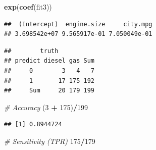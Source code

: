 \documentclass[]{article}
\newenvironment{Shaded}{\begin{snugshade}}{\end{snugshade}}
\newcommand{\KeywordTok}[1]{\textcolor[rgb]{0.13,0.29,0.53}{\textbf{#1}}}
\newcommand{\DataTypeTok}[1]{\textcolor[rgb]{0.13,0.29,0.53}{#1}}
\newcommand{\DecValTok}[1]{\textcolor[rgb]{0.00,0.00,0.81}{#1}}
\newcommand{\FloatTok}[1]{\textcolor[rgb]{0.00,0.00,0.81}{#1}}
\newcommand{\StringTok}[1]{\textcolor[rgb]{0.31,0.60,0.02}{#1}}
\newcommand{\CommentTok}[1]{\textcolor[rgb]{0.56,0.35,0.01}{\textit{#1}}}
\newcommand{\OperatorTok}[1]{\textcolor[rgb]{0.81,0.36,0.00}{\textbf{#1}}}
\newcommand{\NormalTok}[1]{#1}
\begin{document}
\begin{Shaded}
\begin{Highlighting}[]
\KeywordTok{exp}\NormalTok{(}\KeywordTok{coef}\NormalTok{(fit3))}
\end{Highlighting}
\end{Shaded}

\begin{verbatim}
##  (Intercept)  engine.size     city.mpg 
## 3.698542e+07 9.565917e-01 7.050049e-01
\end{verbatim}

\begin{Shaded}
\end{Shaded}

\begin{verbatim}
##        truth
## predict diesel gas Sum
##     0        3   4   7
##     1       17 175 192
##     Sum     20 179 199
\end{verbatim}

\begin{Shaded}
\begin{Highlighting}[]
\CommentTok{# Accuracy}
\NormalTok{(}\DecValTok{3} \OperatorTok{+}\StringTok{ }\DecValTok{175}\NormalTok{)}\OperatorTok{/}\DecValTok{199}
\end{Highlighting}
\end{Shaded}

\begin{verbatim}
## [1] 0.8944724
\end{verbatim}

\begin{Shaded}
\begin{Highlighting}[]
\CommentTok{# Sensitivity (TPR)}
\DecValTok{175}\OperatorTok{/}\DecValTok{179}
\end{Highlighting}
\end{Shaded}
\end{document}
